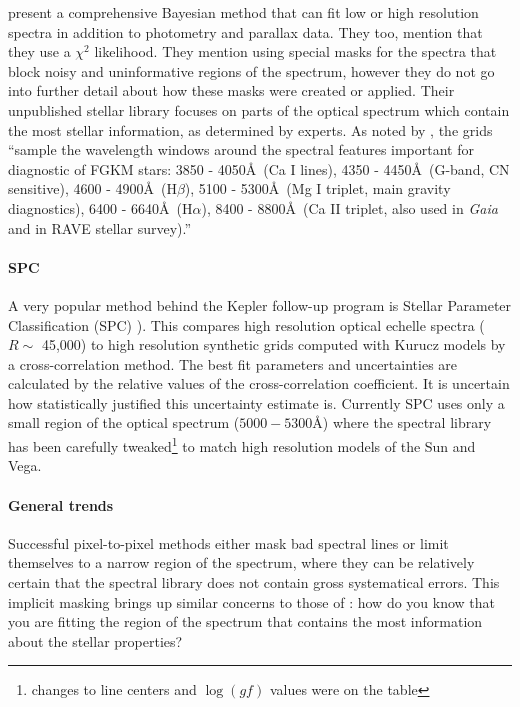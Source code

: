 \documentclass[preprint]{aastex} %
\begin{document}
\citet{sb13} present a comprehensive Bayesian method that can fit low or high resolution spectra in addition to photometry and parallax data. They too, mention that they use a $\chi^2$ likelihood. They mention using special masks for the spectra that block noisy and uninformative regions of the spectrum, however they do not go into further detail about how these masks were created or applied. Their unpublished stellar library focuses on parts of the optical spectrum which contain the most stellar information, as determined by experts. As noted by \citet{sb13}, the grids ``sample the wavelength windows around the spectral features important for diagnostic of FGKM stars: 3850 - 4050\AA\ (Ca I lines), 4350 - 4450\AA\ (G-band, CN sensitive), 4600 - 4900\AA\ (H$\beta$), 5100 - 5300\AA\ (Mg I triplet, main gravity diagnostics), 6400 - 6640\AA\ (H$\alpha$), 8400 - 8800\AA\ (Ca II triplet, also used in \emph{Gaia} and in RAVE stellar survey).'' 

\paragraph{SPC} A very popular method behind the Kepler follow-up program is Stellar Parameter Classification (SPC) \citep{blj+12}). This compares high resolution optical echelle spectra ($R \sim$ 45,000) to high resolution synthetic grids computed with Kurucz models by a cross-correlation method. The best fit parameters and uncertainties are calculated by the relative values of the cross-correlation coefficient. It is uncertain how statistically justified this uncertainty estimate is. Currently SPC uses only a small region of the optical spectrum ($5000 - 5300$\AA) where the spectral library has been carefully tweaked\footnote{changes to line centers and $\log(gf)$ values were on the table} to match high resolution models of the Sun and Vega. 

\paragraph{General trends}
Successful pixel-to-pixel methods either mask bad spectral lines or limit themselves to a narrow region of the spectrum, where they can be relatively certain that the spectral library does not contain gross systematical errors. This implicit masking brings up similar concerns to those of \citet{mga13}: how do you know that you are fitting the region of the spectrum that contains the most information about the stellar properties?
\end{document}
